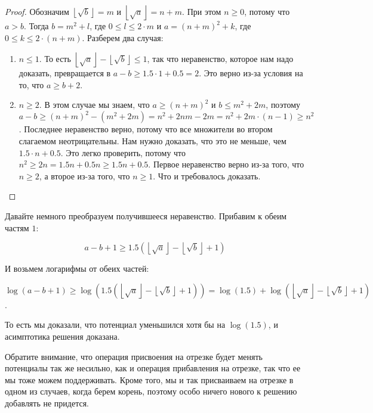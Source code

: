 \begin{proof}
    Обозначим  $\left\lfloor \sqrt{b} \right\rfloor = m$ и $\left\lfloor \sqrt{a} \right\rfloor = n + m$. При этом $n \ge 0$, потому что $a > b$.
    Тогда $b = m^2 + l$, где $0 \le l \le 2 \cdot m$ и $a = (n + m)^2 + k$, где $0 \le k \le 2 \cdot (n + m)$. Разберем два случая:

\begin{enumerate}
    \item $n \le 1$. То есть $\left\lfloor \sqrt{a} \right\rfloor - \left\lfloor \sqrt{b} \right\rfloor \le 1$, так что неравенство, которое нам надо доказать, превращается в $a - b \ge 1.5 \cdot 1 + 0.5 = 2$. Это верно из-за условия на то, что $a \ge b + 2$.
    \item $n \ge 2$. В этом случае мы знаем, что $a \ge (n + m)^2$ и $b \le m^2 + 2m$, поэтому $a - b \ge (n + m)^2 - (m^2 + 2m) = n^2 + 2nm - 2m = n^2 + 2m \cdot (n - 1) \ge n^2$. Последнее неравенство верно, потому что все множители во втором слагаемом неотрицательны. Нам нужно доказать, что это не меньше, чем $1.5 \cdot n + 0.5$. Это легко проверить, потому что $n^2 \ge 2n = 1.5n + 0.5n \ge 1.5n + 0.5$. Первое неравенство верно из-за того, что $n \ge 2$, а второе из-за того, что $n \ge 1$. Что и требовалось доказать.
\end{enumerate}
\end{proof}

Давайте немного преобразуем получившееся неравенство. Прибавим к обеим частям $1$:

$$a - b + 1 \ge 1.5  \left( \left\lfloor \sqrt{a} \right\rfloor - \left\lfloor \sqrt{b} \right\rfloor + 1\right)$$

И возьмем логарифмы от обеих частей:

$\log(a - b + 1) \ge \log \left(1.5  \left( \left\lfloor \sqrt{a} \right\rfloor - \left\lfloor \sqrt{b} \right\rfloor + 1\right)\right) = \log (1.5) + \log \left( \left\lfloor \sqrt{a} \right\rfloor - \left\lfloor \sqrt{b} \right\rfloor + 1\right)$.

То есть мы доказали, что потенциал уменьшился хотя бы на $\log (1.5)$, и асимптотика решения доказана.

\begin{observation}
    Обратите внимание, что операция присвоения на отрезке будет менять потенциалы так же несильно, как и операция прибавления на отрезке, так что ее мы тоже можем поддерживать. Кроме того, мы и так присваиваем на отрезке в одном из случаев, когда берем корень, поэтому особо ничего нового к решению добавлять не придется.
\end{observation}

